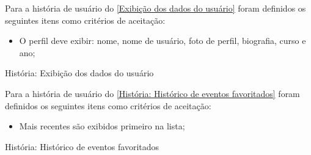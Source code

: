 Para a história de usuário do \autoref{Exibição dos dados do usuário} foram definidos os seguintes itens como critérios de aceitação:

\begin{itemize}
\item O perfil deve exibir: nome, nome de usuário, foto de perfil, biografia, curso e ano;
\end{itemize}

\def\arraystretch{2}
\begin{quadro}[htb]
\centering
\ABNTEXfontereduzida
\caption[História: Exibição dos dados do usuário ]{História: Exibição dos dados do usuário}
\label{Exibição dos dados do usuário}
\end{quadro}
\FloatBarrier 

Para a história de usuário do \autoref{História: Histórico de eventos favoritados} foram definidos os seguintes itens como critérios de aceitação:

\begin{itemize}
\item Mais recentes são exibidos primeiro na lista;
\end{itemize}

\def\arraystretch{2}
\begin{quadro}[htb]
\centering
\ABNTEXfontereduzida
\caption[História: Histórico de eventos favoritados]{História: Histórico de eventos favoritados}
\label{História: Histórico de eventos favoritados}
\end{quadro}
\FloatBarrier 

